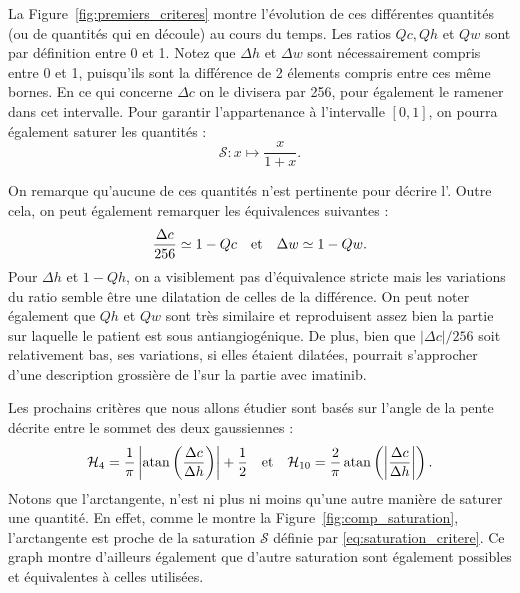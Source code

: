 \documentclass[main.tex]{subfiles}
\begin{document}
La Figure~\ref{fig:premiers_criteres} montre l'évolution de ces différentes quantités (ou de quantités qui en découle) au cours du temps. 
Les ratios $Qc, Qh$ et $Qw$ sont par définition entre 0 et 1. 
Notez que $\Delta h$ et $\Delta w$ sont nécessairement compris entre 0 et 1, puisqu'ils sont la différence de 2 élements compris entre ces même bornes. En ce qui concerne $\Delta c$ on le divisera par 256, pour également le ramener dans cet intervalle. Pour garantir l'appartenance à l'intervalle $[0,1]$, on pourra également saturer les quantités :
\begin{equation}
\label{eq:saturation_critere}
\mathscr{S}: x \longmapsto \dfrac{x}{1+x}.
\end{equation}

On remarque qu'aucune de ces quantités n'est pertinente pour décrire l'\hetero. Outre cela, on peut également remarquer les équivalences suivantes :
\begin{equation}
\label{eq:equiv_diff_rapport}
\dfrac{\Delta c}{256} \simeq 1 - Qc \quad {\rm et } \quad \Delta w \simeq 1 - Qw.
\end{equation}
Pour $\Delta h$ et $1-Qh$, on a visiblement pas d'équivalence stricte mais les variations du ratio semble être une dilatation de celles de la différence.
On peut noter également que $Qh$ et $Qw$ sont très similaire et reproduisent assez bien la partie sur laquelle le patient est sous antiangiogénique. De plus, bien que $| \Delta c | / 256$ soit relativement bas, ses variations, si elles étaient dilatées,  pourrait s'approcher d'une description grossière de l'\hetero sur la partie avec imatinib.

Les prochains critères que nous allons étudier sont basés sur l'angle de la pente 
décrite entre le sommet des deux gaussiennes :
\begin{equation}
\label{eq:critere_pente}
\mathcal{H}_4 = \dfrac{1}{\pi} \left| \operatorname{atan} \left( \dfrac{ \Delta c }{ \Delta h }  \right) \right| + \dfrac{1}{2}
\quad {\rm et } \quad
\mathcal{H}_{10} = \dfrac{2}{\pi} \operatorname{atan} \left( \left| \dfrac{ \Delta c }{ \Delta h } \right| \right).
\end{equation}
Notons que l'arctangente, n'est ni plus ni moins qu'une autre manière de saturer une quantité. En effet, comme le montre la Figure~\ref{fig:comp_saturation}, l'arctangente est proche de la saturation $\mathscr{S}$ définie par \eqref{eq:saturation_critere}. Ce graph montre d'ailleurs également que d'autre saturation sont également possibles et équivalentes à celles utilisées.
\end{document}
